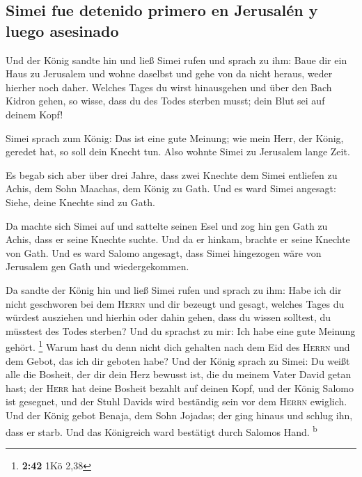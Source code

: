 \hypertarget{simei-fue-detenido-primero-en-jerusaluxe9n-y-luego-asesinado}{%
\subsection{Simei fue detenido primero en Jerusalén y luego
asesinado}\label{simei-fue-detenido-primero-en-jerusaluxe9n-y-luego-asesinado}}

 Und der König sandte hin und ließ Simei rufen und sprach
zu ihm: Baue dir ein Haus zu Jerusalem und wohne daselbst und gehe von
da nicht heraus, weder hierher noch daher.  Welches Tages
du wirst hinausgehen und über den Bach Kidron gehen, so wisse, dass du
des Todes sterben musst; dein Blut sei auf deinem Kopf!

 Simei sprach zum König: Das ist eine gute Meinung; wie
mein Herr, der König, geredet hat, so soll dein Knecht tun. Also wohnte
Simei zu Jerusalem lange Zeit.

 Es begab sich aber über drei Jahre, dass zwei Knechte
dem Simei entliefen zu Achis, dem Sohn Maachas, dem König zu Gath. Und
es ward Simei angesagt: Siehe, deine Knechte sind zu Gath.

 Da machte sich Simei auf und sattelte seinen Esel und
zog hin gen Gath zu Achis, dass er seine Knechte suchte. Und da er
hinkam, brachte er seine Knechte von Gath.  Und es ward
Salomo angesagt, dass Simei hingezogen wäre von Jerusalem gen Gath und
wiedergekommen.

 Da sandte der König hin und ließ Simei rufen und sprach
zu ihm: Habe ich dir nicht geschworen bei dem \textsc{Herrn} und dir
bezeugt und gesagt, welches Tages du würdest ausziehen und hierhin oder
dahin gehen, dass du wissen solltest, du müsstest des Todes sterben? Und
du sprachst zu mir: Ich habe eine gute Meinung gehört. \footnote{\textbf{2:42}
  1Kö 2,38}  Warum hast du denn nicht dich gehalten nach
dem Eid des \textsc{Herrn} und dem Gebot, das ich dir geboten habe?
 Und der König sprach zu Simei: Du weißt alle die
Bosheit, der dir dein Herz bewusst ist, die du meinem Vater David getan
hast; der \textsc{Herr} hat deine Bosheit bezahlt auf deinen Kopf,
 und der König Salomo ist gesegnet, und der Stuhl Davids
wird beständig sein vor dem \textsc{Herrn} ewiglich.  Und
der König gebot Benaja, dem Sohn Jojadas; der ging hinaus und schlug
ihn, dass er starb. Und das Königreich ward bestätigt durch Salomos
Hand. \textsuperscript{b}

